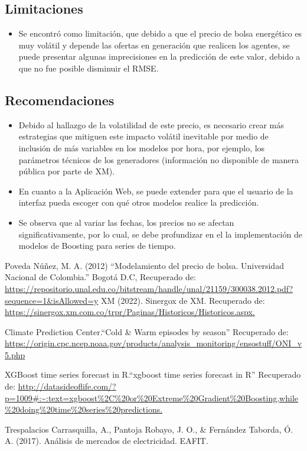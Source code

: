 \documentclass[conference, 10pt]{IEEEtran}
\begin{document}
\subsection{Limitaciones}
\begin{itemize}
\item Se encontró como limitación, que debido  a que el precio de bolsa energético es muy volátil y depende las ofertas en generación que realicen los agentes, se puede presentar algunas imprecisiones en la predicción de este valor, debido a que no fue posible disminuir el RMSE. 
\end{itemize}

\subsection{Recomendaciones}
\begin{itemize}
\item Debido al hallazgo de la volatilidad de este precio, es necesario crear más estrategias que mitiguen este impacto volátil inevitable por medio de inclusión de más variables en los modelos por hora, por ejemplo, los parámetros técnicos de los generadores (información no disponible de manera pública por parte de XM).

\item En cuanto a la Aplicación Web, se puede extender para que el usuario de la interfaz pueda escoger con qué otros modelos realice la predicción.
\item Se observa que al variar las fechas, los precios no se afectan significativamente, por lo cual, se debe profundizar en el la implementación de modelos de Boosting para series de tiempo.

\end{itemize}

\begin{thebibliography}{00}
 Poveda Núñez, M. A. (2012) “Modelamiento del precio de bolsa. Universidad Nacional de Colombia.” Bogotá D.C, Recuperado de: \url{https://repositorio.unal.edu.co/bitstream/handle/unal/21159/300038.2012.pdf?sequence=1&isAllowed=y}
 XM (2022). Sinergox de XM. Recuperado de: \url{ https://sinergox.xm.com.co/trpr/Paginas/Historicos/Historicos.aspx.} 

Climate Prediction Center.“Cold \& Warm episodes by season” Recuperado de: \url{https://origin.cpc.ncep.noaa.gov/products/analysis_monitoring/ensostuff/ONI_v5.php}

XGBoost time series forecast in R.“xgboost time series forecast in R” Recuperado de: \url{http://datasideoflife.com/?p=1009#:~:text=xgboost\%2C\%20or\%20Extreme\%20Gradient\%20Boosting,while\%20doing\%20time\%20series\%20predictions.}

Trespalacios Carrasquilla, A., Pantoja Robayo, J. O., \& Fernández Taborda, Ó. A. (2017). Análisis de mercados de electricidad. EAFIT.

\end{thebibliography}
\end{document}
